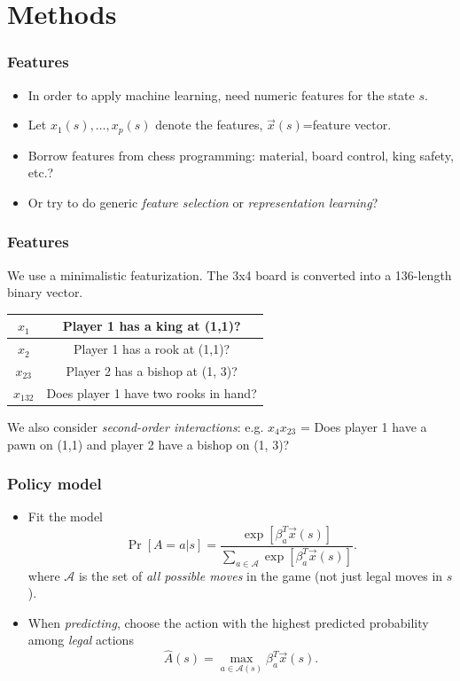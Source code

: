 \documentclass{beamer}
\begin{document}
\section{Methods}

\begin{frame}
\sectionpage
\end{frame}

\begin{frame}
\frametitle{Features}
\begin{itemize}
\item In order to apply machine learning, need numeric features for the state $s$.
\item Let $x_1(s),\hdots, x_p(s)$ denote the features, $\vec{x}(s)$=feature vector.
\item Borrow features from chess programming: material, board control, king safety, etc.?
\item Or try to do generic \emph{feature selection} or \emph{representation learning}?
\end{itemize}
\end{frame}

\begin{frame}
\frametitle{Features}
We use a minimalistic featurization.  The 3x4 board is converted into a 136-length binary vector.\vspace{0.5in}

\begin{tabular}{c|c}
\hline
$x_1$ & Player 1 has a king at (1,1)?\\ \hline
$x_2$ & Player 1 has a rook at (1,1)?\\ \hline
$x_{23}$ & Player 2 has a bishop at (1, 3)?\\ \hline
$x_{132}$ & Does player 1 have two rooks in hand? \\\hline
\end{tabular}
\vspace{0.5in}

We also consider \emph{second-order interactions}: e.g. $x_4x_{23}$ = Does player 1 have a pawn on (1,1) and player 2 have a bishop on (1, 3)?

\end{frame}


\begin{frame}
\frametitle{Policy model}
\begin{itemize}
\item Fit the model
\[
\Pr[A = a|s] = \frac{\exp[\beta_a^T \vec{x}(s)]}{\sum_{a \in \mathcal{A}} \exp[\beta_a^T \vec{x}(s)]}.
\]
where $\mathcal{A}$ is the set of \emph{all possible moves} in the game (not just legal moves in $s$).
\item When \emph{predicting}, choose the action with the highest predicted probability among \emph{legal} actions
\[
\hat{A}(s) = \max_{a \in \mathcal{A}(s)} \beta_a^T \vec{x}(s).
\]
\end{itemize}
\end{frame}
\end{document}
